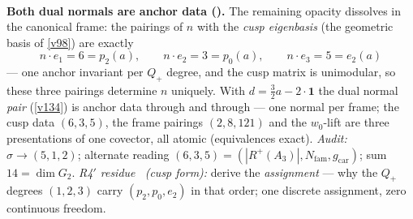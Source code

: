 \documentclass[11pt,a4paper]{article}
\newcommand{\Nfam}{N_{\mathrm{fam}}}
\newcommand{\gcar}{g_{\mathrm{car}}}
\begin{document}
\begin{keybox}
\smallskip\\
\noindent\textbf{Both dual normals are anchor data ().} The remaining
opacity dissolves in the canonical frame: the pairings of $n$ with the \emph{cusp eigenbasis} (the
geometric basis of \vref{v98}) are exactly
\[
  \boxed{\ n\cdot e_1=6=p_2(a),\qquad n\cdot e_2=3=p_0(a),\qquad n\cdot e_3=5=e_2(a)\ }
\]
--- one anchor invariant per $Q_+$ degree, and the cusp matrix is unimodular, so these three pairings
determine $n$ uniquely. With $d=\tfrac32a-2\cdot\mathbf1$ the dual normal \emph{pair} (\vref{v134}) is
anchor data through and through --- one normal per frame; the cusp data $(6,3,5)$, the frame pairings
$(2,8,121)$ and the $w_0$-lift are three presentations of one covector, all atomic (equivalences exact).
\emph{Audit:} $\sigma\to(5,1,2)$; alternate reading $(6,3,5)=(|R^+(A_3)|,\Nfam,\gcar)$; sum
$14=\dim G_2$. \emph{R4$'$ residue \mC\ (cusp form):} derive the \emph{assignment} --- why the $Q_+$
degrees $(1,2,3)$ carry $(p_2,p_0,e_2)$ in that order; one discrete assignment, zero continuous freedom.
\end{keybox}
\end{document}
